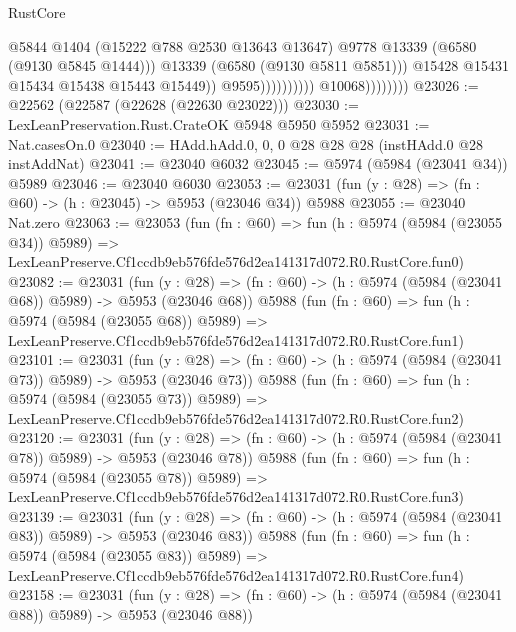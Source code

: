 \begin{lexlean}{RustCore}
\begin{coremodule}
                                                @5844
                                                @1404
                                                (@15222 @788 @2530 @13643 @13647)
                                                @9778
                                                @13339
                                                (@6580 (@9130 @5845 @1444)))
                                              @13339
                                              (@6580 (@9130 @5811 @5851)))
                                            @15428
                                            @15431
                                            @15434
                                            @15438
                                            @15443
                                            @15449))
                                        @9595))))))))))
                    @10068))))))))
@23026 := @22562 (@22587 (@22628 (@22630 @23022)))
@23030 := LexLeanPreservation.Rust.CrateOK @5948 @5950 @5952
@23031 := Nat.casesOn.{0}
@23040 := HAdd.hAdd.{0, 0, 0} @28 @28 @28 (instHAdd.{0} @28 instAddNat)
@23041 := @23040 @6032
@23045 := @5974 (@5984 (@23041 @34)) @5989
@23046 := @23040 @6030
@23053 := @23031 (fun (y : @28) => (fn : @60) -> (h : @23045) -> @5953 (@23046 @34)) @5988
@23055 := @23040 Nat.zero
@23063 := @23053
    (fun (fn : @60) =>
    fun (h : @5974 (@5984 (@23055 @34)) @5989) =>
    LexLeanPreserve.Cf1ccdb9eb576fde576d2ea141317d072.R0.RustCore.fun0)
@23082 := @23031
    (fun (y : @28) => (fn : @60) -> (h : @5974 (@5984 (@23041 @68)) @5989) -> @5953 (@23046 @68))
    @5988
    (fun (fn : @60) =>
    fun (h : @5974 (@5984 (@23055 @68)) @5989) =>
    LexLeanPreserve.Cf1ccdb9eb576fde576d2ea141317d072.R0.RustCore.fun1)
@23101 := @23031
    (fun (y : @28) => (fn : @60) -> (h : @5974 (@5984 (@23041 @73)) @5989) -> @5953 (@23046 @73))
    @5988
    (fun (fn : @60) =>
    fun (h : @5974 (@5984 (@23055 @73)) @5989) =>
    LexLeanPreserve.Cf1ccdb9eb576fde576d2ea141317d072.R0.RustCore.fun2)
@23120 := @23031
    (fun (y : @28) => (fn : @60) -> (h : @5974 (@5984 (@23041 @78)) @5989) -> @5953 (@23046 @78))
    @5988
    (fun (fn : @60) =>
    fun (h : @5974 (@5984 (@23055 @78)) @5989) =>
    LexLeanPreserve.Cf1ccdb9eb576fde576d2ea141317d072.R0.RustCore.fun3)
@23139 := @23031
    (fun (y : @28) => (fn : @60) -> (h : @5974 (@5984 (@23041 @83)) @5989) -> @5953 (@23046 @83))
    @5988
    (fun (fn : @60) =>
    fun (h : @5974 (@5984 (@23055 @83)) @5989) =>
    LexLeanPreserve.Cf1ccdb9eb576fde576d2ea141317d072.R0.RustCore.fun4)
@23158 := @23031
    (fun (y : @28) => (fn : @60) -> (h : @5974 (@5984 (@23041 @88)) @5989) -> @5953 (@23046 @88))

\end{coremodule}
\end{lexlean}
